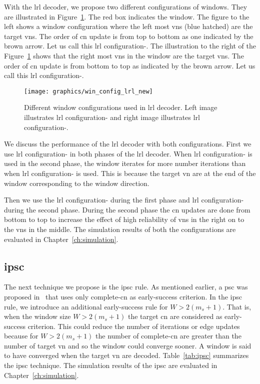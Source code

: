 With the \ac{lrl} decoder, we propose two different configurations of windows. They are illustrated in Figure~\ref{fig:win_config_lrl}. The red box indicates the window. The figure to the left shows a window configuration where the left most \acp{vn} (blue hatched) are the target \acp{vn}. The order of \ac{cn} update is from top to bottom as one indicated by the brown arrow. Let us call this \ac{lrl} configuration-. The illustration to the right of the Figure~\ref{fig:win_config_lrl} shows that the right most \acp{vn} in the window are the target \acp{vn}. The order of \ac{cn} update is from bottom to top as indicated by the brown arrow. Let us call this \ac{lrl} configuration-.

\begin{figure}[htbp]
  \centering
  \texttt{[image: graphics/win\_config\_lrl\_new]}
  \caption{Different window configurations used in \ac{lrl} decoder. Left image illustrates \ac{lrl} configuration- and right image illustrates \ac{lrl} configuration-.}
  \label{fig:win_config_lrl}
\end{figure}

We discuss the performance of the \ac{lrl} decoder with both configurations. First we use \ac{lrl} configuration- in both phases of the \ac{lrl} decoder. When \ac{lrl} configuration- is used in the second phase, the window iterates for more number iterations than when \ac{lrl} configuration- is used. This is because the target \ac{vn} are at the end of the window corresponding to the window direction.

Then we use the \ac{lrl} configuration- during the first phase and \ac{lrl} configuration- during the second phase. During the second phase the \ac{cn} updates are done from bottom to top to increase the effect of high reliability of \acp{vn} in the right on to the \acp{vn} in the middle. The simulation results of both the configurations are evaluated in Chapter~\ref{ch:simulation}.

\subsection{\acl{ipsc}}
The next technique we propose is the \ac{ipsc} rule. As mentioned earlier, a \ac{psc} was proposed in~\cite{Kang2018} that uses only complete-\ac{cn} as early-success criterion. In the \ac{ipsc} rule, we introduce an additional early-success rule for $W>2(m_s+1)$. That is, when the window size $W>2(m_s+1)$ the target \ac{cn} are considered as early-success criterion. This could reduce the number of iterations or edge updates because for $W>2(m_s+1)$ the number of complete-\ac{cn} are greater than the number of target \ac{vn} and so the window could converge sooner. A window is said to have converged when the target \ac{vn} are decoded. Table~\ref{tab:ipsc} summarizes the \ac{ipsc} technique. The simulation results of the \ac{ipsc} are evaluated in Chapter~\ref{ch:simulation}.

